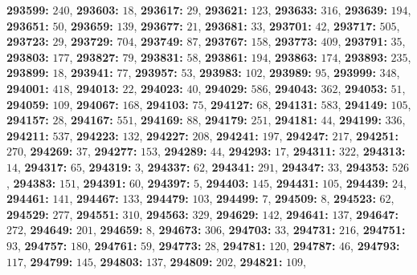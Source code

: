 \textsf{\bfseries 293599:} $240$, \textsf{\bfseries 293603:} $18$, \textsf{\bfseries 293617:} $29$, \textsf{\bfseries 293621:} $123$, \textsf{\bfseries 293633:} $316$, \textsf{\bfseries 293639:} $194$, \textsf{\bfseries 293651:} $50$, \textsf{\bfseries 293659:} $139$, \textsf{\bfseries 293677:} $21$, \textsf{\bfseries 293681:} $33$, \textsf{\bfseries 293701:} $42$, \textsf{\bfseries 293717:} $505$, \textsf{\bfseries 293723:} $29$, \textsf{\bfseries 293729:} $704$, \textsf{\bfseries 293749:} $87$, \textsf{\bfseries 293767:} $158$, \textsf{\bfseries 293773:} $409$, \textsf{\bfseries 293791:} $35$, \textsf{\bfseries 293803:} $177$, \textsf{\bfseries 293827:} $79$, \textsf{\bfseries 293831:} $58$, \textsf{\bfseries 293861:} $194$, \textsf{\bfseries 293863:} $174$, \textsf{\bfseries 293893:} $235$, \textsf{\bfseries 293899:} $18$, \textsf{\bfseries 293941:} $77$, \textsf{\bfseries 293957:} $53$, \textsf{\bfseries 293983:} $102$, \textsf{\bfseries 293989:} $95$, \textsf{\bfseries 293999:} $348$, \textsf{\bfseries 294001:} $418$, \textsf{\bfseries 294013:} $22$, \textsf{\bfseries 294023:} $40$, \textsf{\bfseries 294029:} $586$, \textsf{\bfseries 294043:} $362$, \textsf{\bfseries 294053:} $51$, \textsf{\bfseries 294059:} $109$, \textsf{\bfseries 294067:} $168$, \textsf{\bfseries 294103:} $75$, \textsf{\bfseries 294127:} $68$, \textsf{\bfseries 294131:} $583$, \textsf{\bfseries 294149:} $105$, \textsf{\bfseries 294157:} $28$, \textsf{\bfseries 294167:} $551$, \textsf{\bfseries 294169:} $88$, \textsf{\bfseries 294179:} $251$, \textsf{\bfseries 294181:} $44$, \textsf{\bfseries 294199:} $336$, \textsf{\bfseries 294211:} $537$, \textsf{\bfseries 294223:} $132$, \textsf{\bfseries 294227:} $208$, \textsf{\bfseries 294241:} $197$, \textsf{\bfseries 294247:} $217$, \textsf{\bfseries 294251:} $270$, \textsf{\bfseries 294269:} $37$, \textsf{\bfseries 294277:} $153$, \textsf{\bfseries 294289:} $44$, \textsf{\bfseries 294293:} $17$, \textsf{\bfseries 294311:} $322$, \textsf{\bfseries 294313:} $14$, \textsf{\bfseries 294317:} $65$, \textsf{\bfseries 294319:} $3$, \textsf{\bfseries 294337:} $62$, \textsf{\bfseries 294341:} $291$, \textsf{\bfseries 294347:} $33$, \textsf{\bfseries 294353:} $526$, \textsf{\bfseries 294383:} $151$, \textsf{\bfseries 294391:} $60$, \textsf{\bfseries 294397:} $5$, \textsf{\bfseries 294403:} $145$, \textsf{\bfseries 294431:} $105$, \textsf{\bfseries 294439:} $24$, \textsf{\bfseries 294461:} $141$, \textsf{\bfseries 294467:} $133$, \textsf{\bfseries 294479:} $103$, \textsf{\bfseries 294499:} $7$, \textsf{\bfseries 294509:} $8$, \textsf{\bfseries 294523:} $62$, \textsf{\bfseries 294529:} $277$, \textsf{\bfseries 294551:} $310$, \textsf{\bfseries 294563:} $329$, \textsf{\bfseries 294629:} $142$, \textsf{\bfseries 294641:} $137$, \textsf{\bfseries 294647:} $272$, \textsf{\bfseries 294649:} $201$, \textsf{\bfseries 294659:} $8$, \textsf{\bfseries 294673:} $306$, \textsf{\bfseries 294703:} $33$, \textsf{\bfseries 294731:} $216$, \textsf{\bfseries 294751:} $93$, \textsf{\bfseries 294757:} $180$, \textsf{\bfseries 294761:} $59$, \textsf{\bfseries 294773:} $28$, \textsf{\bfseries 294781:} $120$, \textsf{\bfseries 294787:} $46$, \textsf{\bfseries 294793:} $117$, \textsf{\bfseries 294799:} $145$, \textsf{\bfseries 294803:} $137$, \textsf{\bfseries 294809:} $202$, \textsf{\bfseries 294821:} $109$, 
